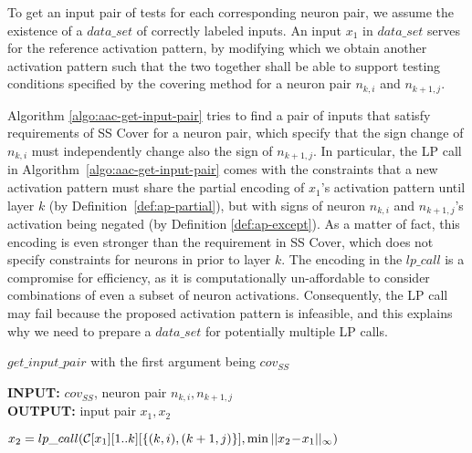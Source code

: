\documentclass[runningheads,a4paper]{llncs}
\newcommand{\distance}[2]{ ||#1||_{#2}}
\newcommand{\covered}[3]{cov_{#1}^{#2}#3}
\begin{document}
To get an input pair of tests for each corresponding neuron pair, we assume
the existence of a $data\_set$ of correctly labeled inputs.  An input $x_1$
in $data\_set$ serves for the reference activation pattern, by modifying
which we obtain another activation pattern such that the two together shall
be able to support testing conditions specified by the covering method for a
neuron pair $n_{k,i}$ and $n_{k+1,j}$.

Algorithm \ref{algo:aac-get-input-pair} tries to find a pair of inputs that
satisfy requirements of SS Cover for a neuron pair, which specify that
the sign change of $n_{k,i}$ must independently change also the sign of
$n_{k+1,j}$.  In particular, the LP call in
Algorithm~\ref{algo:aac-get-input-pair} comes with the constraints that a
new activation pattern must share the partial encoding of $x_1$'s activation
pattern until layer $k$ (by Definition~\ref{def:ap-partial}), but with signs
of neuron $n_{k,i}$ and $n_{k+1,j}$'s activation being negated (by
Definition \ref{def:ap-except}).  As a matter of fact, this encoding is even
stronger than the requirement in SS Cover, which does not
specify constraints for neurons in prior to layer $k$.  The encoding in the
$lp\_call$ is a compromise for efficiency, as it is computationally
un-affordable to consider combinations of even a subset of neuron
activations.  Consequently, the LP call may fail because the proposed
activation pattern is infeasible, and this explains why we need to prepare a
$data\_set$ for potentially multiple LP calls.

\begin{algorithm}[!htp]
  \caption{$get\_input\_pair$ with the first argument being $\covered{SS}{}{}$}
  \label{algo:aac-get-input-pair}
  \begin{flushleft}
    \textbf{INPUT:} $\covered{SS}{}{}$, neuron pair $n_{k,i},n_{k+1,j}$\\
    \textbf{OUTPUT:} input pair $x_1, x_2$
  \end{flushleft}
  \begin{algorithmic}[1]
    \State $x_2=lp\_call(\constraints[x_1][1..k][\{(k,i), (k+1,j)\}], \min{\distance{x_2\!-\!x_1}{\infty}})$
       

      \EndIf
    \EndFor
    \State \Return{\_, \_}
  \end{algorithmic}
\end{algorithm}%
\end{document}
